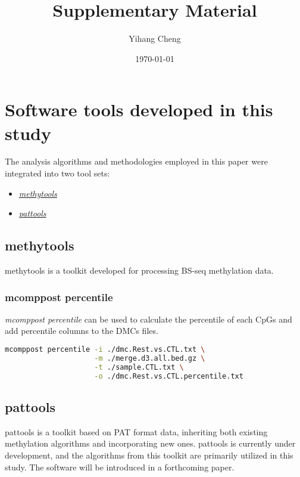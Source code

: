 \documentclass[10pt]{article}
\title{Supplementary Material}
\author{Yihang Cheng}
\date{\today}
\begin{document}
\maketitle
\newpage
\tableofcontents
\newpage
\section{Software tools developed in this study}\label{sec:software-develope}
The analysis algorithms and methodologies employed in this paper were integrated into two tool sets:

\begin{itemize}
    \item  \href{https://github.com/hcyvan/epiLungCancer/tree/main/methytools}{\textit{methytools}}
    \item \href{https://github.com/hcyvan/pattools}{\textit{pattools}}
\end{itemize}

\subsection{methytools}\label{sec:software-develope-methytools}

methytools is a toolkit developed for processing BS-seq methylation data.

\subsubsection{mcomppost percentile}

\emph{mcomppost percentile} can be used to calculate the percentile of each CpGs and add percentile columns to the DMCs files.

\begin{lstlisting}[language=sh, caption={}]
mcomppost percentile -i ./dmc.Rest.vs.CTL.txt \
                     -m ./merge.d3.all.bed.gz \
                     -t ./sample.CTL.txt \
                     -o ./dmc.Rest.vs.CTL.percentile.txt
\end{lstlisting}

\subsection{pattools}\label{sec:software-develope-pattools}

pattools is a toolkit based on PAT format\cite{Loyfer2024.05.08.593132} data, inheriting both existing
methylation algorithms and incorporating new ones.
    {pattools} is currently under development, and the algorithms from this toolkit are primarily utilized
in this study. The software will be introduced in a forthcoming paper.
\end{document}
